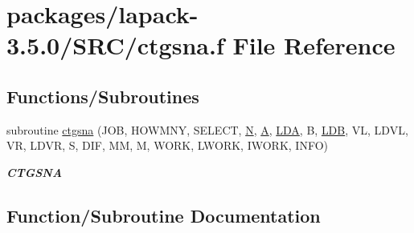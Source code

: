 \hypertarget{ctgsna_8f}{}\section{packages/lapack-\/3.5.0/\+S\+R\+C/ctgsna.f File Reference}
\label{ctgsna_8f}
\subsection*{Functions/\+Subroutines}
\begin{DoxyCompactItemize}
\item 
subroutine \hyperlink{ctgsna_8f_a9b58d99b63263d7dbbeaecd9d0e3a755}{ctgsna} (J\+O\+B, H\+O\+W\+M\+N\+Y, S\+E\+L\+E\+C\+T, \hyperlink{polmisc_8c_a0240ac851181b84ac374872dc5434ee4}{N}, \hyperlink{classA}{A}, \hyperlink{example__user_8c_ae946da542ce0db94dced19b2ecefd1aa}{L\+D\+A}, B, \hyperlink{example__user_8c_a50e90a7104df172b5a89a06c47fcca04}{L\+D\+B}, V\+L, L\+D\+V\+L, V\+R, L\+D\+V\+R, S, D\+I\+F, M\+M, M, W\+O\+R\+K, L\+W\+O\+R\+K, I\+W\+O\+R\+K, I\+N\+F\+O)
\begin{DoxyCompactList}\small\item\em {\bfseries C\+T\+G\+S\+N\+A} \end{DoxyCompactList}\end{DoxyCompactItemize}


\subsection{Function/\+Subroutine Documentation}
\hypertarget{ctgsna_8f_a9b58d99b63263d7dbbeaecd9d0e3a755}{}
